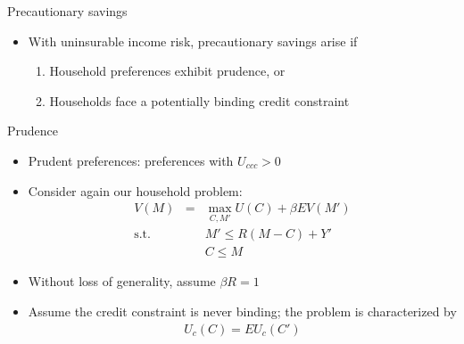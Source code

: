 \documentclass[9pt]{beamer}
\newcommand{\bit}{\begin{itemize}}
\newcommand{\eit}{\end{itemize}}
\newcommand{\ben}{\begin{enumerate}}
\newcommand{\een}{\end{enumerate}}
\newcommand{\bc}{\color{blue}}
\begin{document}
\begin{frame}{Precautionary savings}

\bit
\setlength\itemsep{1em}

\item With uninsurable income risk, {\bc precautionary savings} arise if
\ben
\setlength\itemsep{0.5em}
\item Household preferences exhibit {\bc prudence}, or

\item Households face a potentially binding {\bc credit constraint}
\een 


\eit

\end{frame}




\begin{frame}{Prudence}

\bit
\setlength\itemsep{1.5em}

\item Prudent preferences: preferences with $U_{ccc}>0$

\item Consider again our household problem:
\begin{eqnarray}
V(M) &=& \max_{C, M'} U(C) + \beta E V(M') \nonumber \\
\text{s.t.} && M' \leq R(M-C)+Y' \nonumber \\
&& C \leq M \nonumber
\end{eqnarray}

\item Without loss of generality, assume $\beta R =1$

\item Assume the credit constraint is never binding; the problem is characterized by
\begin{eqnarray}
U_c(C) = E U_c(C') \nonumber
\end{eqnarray}


\eit

\end{frame}
\end{document}
